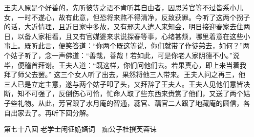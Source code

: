 \documentclass[12pt,oneside]{book}
\begin{document}
王夫人原是个好善的，先听彼等之语不肯听其自由者，因思芳官等不过皆系小儿女，一时不遂心，故有此意，但恐将来熬不得清净，反致获罪。今听了这两个拐子的话，大近情理，且近日家中多故，又有邢夫人遣人来知会，明日接迎春家去住两日，以备人家相看，且又有官媒婆来求说探春等事，心绪甚烦，哪里着意在这些小事上。既听此言，便笑答道：“你两个既这等说，你们就带了作徒弟去，如何？”两个姑子听了，念一声佛道：“善哉，善哉！若如此，可是你老人家阴德不小。”说毕，便稽首拜谢。王夫人道：“既这样，你们问他们去。若果真心，即上来当着我拜了师父去罢。”
这三个女人听了出去，果然将他三人带来。王夫人问之再三，他三人已是立定主意，遂与两个姑子叩了头，又拜辞了王夫人。王夫人见他们意皆决断，知不可强了，反倒伤心可怜，忙命人取了些东西来赉赏了他们，又送了两个姑子些礼物。从此，芳官跟了水月庵的智通，蕊官、藕官二人跟了地藏庵的圆信，各自出家去了。再听下回分解。


 
第七十八回  老学士闲征姽婳词　痴公子杜撰芙蓉诔
\end{document}
